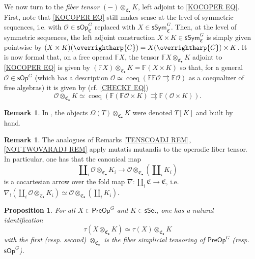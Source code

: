 \documentclass[a4paper,10pt
,draft
]{article}%
\numberwithin{equation}{section}
\numberwithin{figure}{section}
\newtheorem{proposition}[equation]{Proposition}%
\theoremstyle{definition} %
\newtheorem{remark}[equation]{Remark}%
\newcommand{\vect}[1]{\text{\overrightharp{\ensuremath{#1}}}}
\newcommand{\sSet}{\ensuremath{\mathsf{sSet}}}%
\newcommand{\sOp}{\ensuremath{\mathsf{sOp}}}%
\renewcommand{\O}{\ensuremath{\mathcal O}}
\newcommand{\1}{\ensuremath{\mathbbm 1}}%
\begin{document}
We now turn to the \emph{fiber tensor} 
$(-)\otimes_{\mathfrak{C}_{\bullet}} K$,
left adjoint to \eqref{KOCOPER EQ}.
First, note that 
\eqref{KOCOPER EQ}
still makes sense 
at the level of symmetric sequences, i.e. 
with 
$\O \in \mathsf{sOp}^G_{\mathfrak{C}}$
replaced with
$X \in \mathsf{sSym}^G_{\mathfrak{C}}$.
Then, at the level of symmetric sequences, the left adjoint construction
$X \times K \in \mathsf{sSym}^G_{\mathfrak{C}}$
is simply given pointwise by
$(X \times K)(\vect{C}) = X(\vect{C}) \times K$.
It is now formal that, 
on a free operad $\mathbb{F} X$,
the tensor $\mathbb{F} X \otimes_{\mathfrak{C}_{\bullet}} K$
adjoint to \eqref{KOCOPER EQ} is given by 
$(\mathbb{F} X) \otimes_{\mathfrak{C}_{\bullet}} K
= \mathbb{F} (X \times K)$
so that,
for a general $\O \in \mathsf{sOp}^G$
(which has a description
$\O \simeq \mathop{\mathrm{coeq}} (\mathbb{F}\mathbb{F}\O \rightrightarrows \mathbb{F}\O)$
as a coequalizer of free algebras)
it is given by (cf. \eqref{CHECKF EQ})
\begin{equation}\label{OTIMESC EQ}
\mathcal{O} \otimes_{\mathfrak{C}_{\bullet}} K
\simeq
\mathop{\mathrm{coeq}}
\left(
\mathbb{F} (\mathbb{F} \O \times K) 
\rightrightarrows \mathbb{F} (\O \times K) 
\right).
\end{equation}
\begin{remark}\label{BYHAND2 REM}
	In \cite[\S 7.1]{CM13b}, 
	the objects $\Omega(T)  \otimes_{\mathfrak{C}_{\bullet}} K$
	were denoted $T[K]$ and built by hand.
\end{remark}


\begin{remark}
	The analogues of
	Remarks \ref{TENSCOADJ REM},\ref{NOTTWOVARADJ REM}
	apply mutatis mutandis to the operadic fiber tensor.
%	
	In particular, one has that the canonical map
\begin{equation}\label{COCARTAR EQ}
	\amalg_i \O \otimes_{\mathfrak{C}_{\bullet}} K_i
\to
	\O \otimes_{\mathfrak{C}_{\bullet}} (\amalg_i K_i)
\end{equation}
	is a cocartesian arrow over the fold map
	$\nabla \colon \amalg_i \mathfrak{C} \to \mathfrak{C}$,
	i.e. 
	$\nabla_!\left(\amalg_i \O \otimes_{\mathfrak{C}_{\bullet}} K_i \right)
		\simeq
	\O \otimes_{\mathfrak{C}_{\bullet}} (\amalg_i K_i)$.
\end{remark}



\begin{proposition}\label{TAUOTIMES_PROP}
	For all $X \in \mathsf{PreOp}^G$ and $K \in \sSet$, 
	one has a natural identification
	\[\tau(X \otimes_{\mathfrak{C}_{\bullet}} K) \simeq \tau(X) \otimes_{\mathfrak{C}_{\bullet}} K\]
	with the first (resp. second) $\otimes_{\mathfrak{C}_{\bullet}}$ is 
	the fiber simplicial tensoring of $\mathsf{PreOp}^G$ 
	(resp. $\sOp^G$).
\end{proposition}
\end{document}
